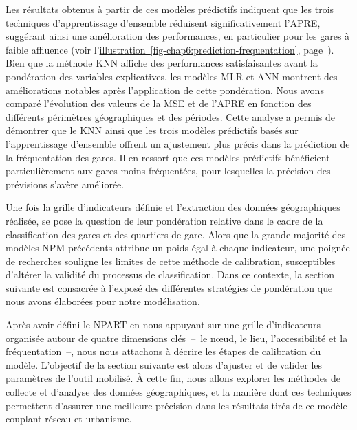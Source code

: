 \begin{refsegment}
Les résultats obtenus à partir de ces modèles prédictifs indiquent que les trois techniques d'apprentissage d'ensemble réduisent significativement l'\acrshort{APRE}, suggérant ainsi une amélioration des performances, en particulier pour les gares à faible affluence (voir l'\hyperref[fig-chap6:prediction-frequentation]{illustration~\ref{fig-chap6:prediction-frequentation}}, page~\pageref{fig-chap6:prediction-frequentation}). Bien que la méthode \acrshort{KNN} affiche des performances satisfaisantes avant la pondération des variables explicatives, les modèles \acrshort{MLR} et \acrshort{ANN} montrent des améliorations notables après l'application de cette pondération. Nous avons comparé l'évolution des valeurs de la \acrshort{MSE} et de l'\acrshort{APRE} en fonction des différents périmètres géographiques et des périodes. Cette analyse a permis de démontrer que le \acrshort{KNN} ainsi que les trois modèles prédictifs basés sur l'apprentissage d'ensemble offrent un ajustement plus précis dans la prédiction de la fréquentation des gares. Il en ressort que ces modèles prédictifs bénéficient particulièrement aux gares moins fréquentées, pour lesquelles la précision des prévisions s'avère améliorée.%

Une fois la grille d'indicateurs définie et l'extraction des données géographiques réalisée, se pose la question de leur pondération relative dans le cadre de la classification des gares et des quartiers de gare. Alors que la grande majorité des modèles \acrshort{NPM} précédents attribue un poids égal à chaque indicateur, une poignée de recherches souligne les limites de cette méthode de calibration, susceptibles d'altérer la validité du processus de classification. Dans ce contexte, la section suivante est consacrée à l'exposé des différentes stratégies de pondération que nous avons élaborées pour notre modélisation.%

Après avoir défini le \acrshort{NPART} en nous appuyant sur une grille d’indicateurs organisée autour de quatre dimensions clés~–~le nœud, le lieu, l'accessibilité et la fréquentation~–, nous nous attachons à décrire les étapes de calibration du modèle. L'objectif de la section suivante est alors d'ajuster et de valider les paramètres de l'outil mobilisé. À cette fin, nous allons explorer les méthodes de collecte et d'analyse des données géographiques, et la manière dont ces techniques permettent d'assurer une meilleure précision dans les résultats tirés de ce modèle couplant réseau et urbanisme.%


\end{refsegment}
